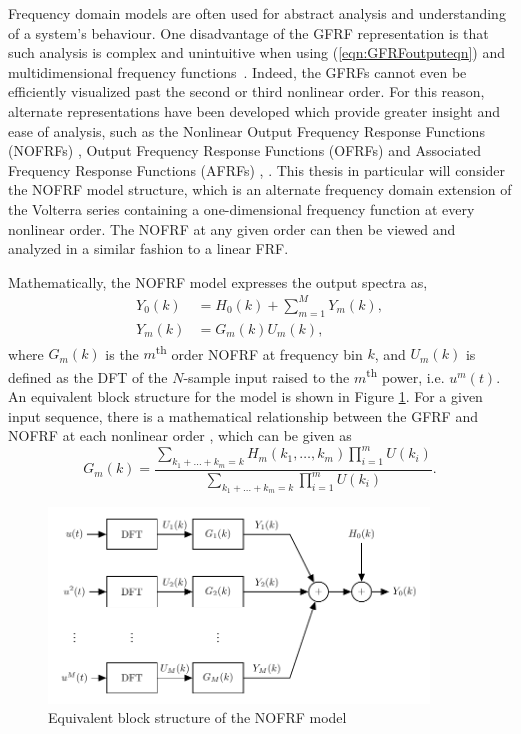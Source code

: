 Frequency domain models are often used for abstract analysis and understanding of a system's behaviour. One disadvantage of the GFRF representation is that such analysis is complex and unintuitive when using (\ref{eqn:GFRFoutputeqn}) and multidimensional frequency functions~\cite{Billings1989}. Indeed, the GFRFs cannot even be efficiently visualized past the second or third nonlinear order. For this reason, alternate representations have been developed which provide greater insight and ease of analysis, such as the Nonlinear Output Frequency Response Functions (NOFRFs) \cite{Lang2005}, Output Frequency Response Functions (OFRFs) \cite{Lang2007} and Associated Frequency Response Functions (AFRFs) \cite{Feijoo2005}, \cite{Feijoo2006}. This thesis in particular will consider the NOFRF model structure, which is an alternate frequency domain extension of the Volterra series containing a one-dimensional frequency function at every nonlinear order. The NOFRF at any given order can then be viewed and analyzed in a similar fashion to a linear FRF. 

Mathematically, the NOFRF model expresses the output spectra as,
\begin{align}
Y_0(k) &= H_0(k) + \sum_{m=1}^{M} Y_m(k), \\
Y_m(k) &= G_m(k) U_m(k),  \label{eq:NOFRF_TransientFree}
\end{align}
where $G_m(k)$ is the $m$\textsuperscript{th} order NOFRF at frequency bin $k$, and $U_m(k)$ is defined as the DFT of the $N$-sample input raised to the $m$\textsuperscript{th} power, i.e. $u^m(t)$. An equivalent block structure for the model is shown in Figure \ref{fig:NOFRF_ModelStructure}. For a given input sequence, there is a mathematical relationship between the GFRF and NOFRF at each nonlinear order \cite{Cheng2017}, which can be given as
\begin{equation}
G_m(k) = \frac{\sum\limits_{k_1+\hdots+k_m = k} H_m(k_1, \hdots, k_m) \prod\limits_{i=1}^m U(k_i)}{\sum\limits_{k_1+\hdots+k_m = k} \prod\limits_{i=1}^m U(k_i)}.
\label{eq:GFRF2NOFRF}
\end{equation}

\begin{figure}[h]
\centering
\includegraphics[width=0.9\textwidth]{Chapter3_VolterraSeries/NOFRF_blockstructure.pdf}
\caption{Equivalent block structure of the NOFRF model}
\label{fig:NOFRF_ModelStructure}
\end{figure}

